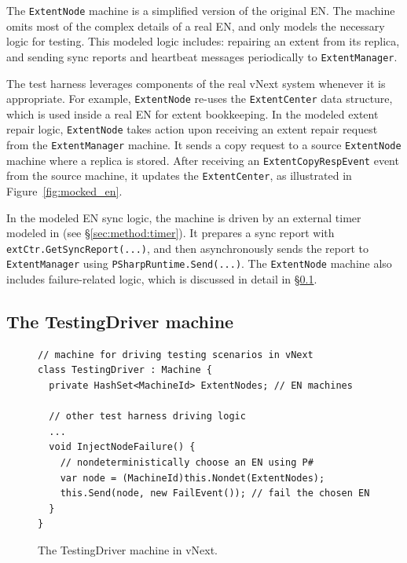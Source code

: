 The \texttt{ExtentNode} machine is a simplified version of the original EN. The machine omits most of the complex details of a real EN, and only models the necessary logic for testing. This modeled logic includes: repairing an extent from its replica, and sending sync reports and heartbeat messages periodically to \texttt{ExtentManager}. 

The \psharp test harness leverages components of the real vNext system whenever it is appropriate. For example, \texttt{ExtentNode} re-uses the \texttt{ExtentCenter} data structure, which is used inside a real EN for extent bookkeeping. In the modeled extent repair logic, \texttt{ExtentNode} takes action upon receiving an extent repair request from the \texttt{ExtentManager} machine. It sends a copy request to a source \texttt{ExtentNode} machine where a replica is stored. After receiving an \texttt{ExtentCopyRespEvent} event from the source machine, it updates the \texttt{ExtentCenter}, as illustrated in Figure~\ref{fig:mocked_en}. 

In the modeled EN sync logic, the machine is driven by an external timer modeled in \psharp (see \S\ref{sec:method:timer}). It prepares a sync report with \texttt{extCtr.GetSyncReport(...)}, and then asynchronously sends the report to \texttt{ExtentManager} using \texttt{PSharpRuntime.Send(...)}. The \texttt{ExtentNode} machine also includes failure-related logic, which is discussed in detail in \S\ref{sec:method:driver}.

\subsection{The TestingDriver machine}
\label{sec:method:driver}

\begin{figure}[t]
\begin{lstlisting}
// machine for driving testing scenarios in vNext
class TestingDriver : Machine {
  private HashSet<MachineId> ExtentNodes; // EN machines
  
  // other test harness driving logic
  ...
  void InjectNodeFailure() {
    // nondeterministically choose an EN using P#
    var node = (MachineId)this.Nondet(ExtentNodes);    
    this.Send(node, new FailEvent()); // fail the chosen EN
  }
}
\end{lstlisting}
\vspace{-3mm}
\caption{The TestingDriver machine in vNext.}
\label{fig:testing_driver}
\vspace{-2mm}
\end{figure}

